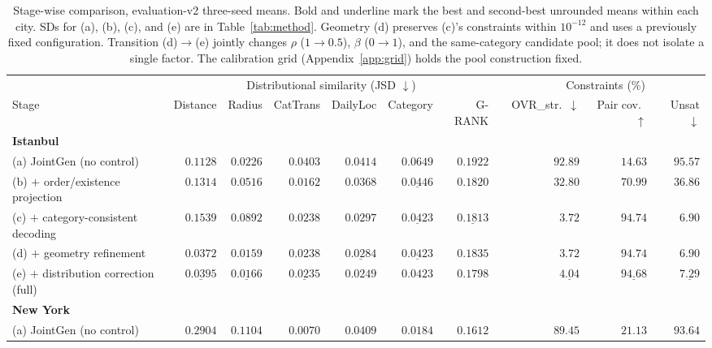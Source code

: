 \begin{table}[t]
\centering
\scriptsize
\setlength{\tabcolsep}{2pt}
\caption{Stage-wise comparison, evaluation-v2 three-seed means. Bold and underline mark the best and second-best unrounded means within each city. SDs for (a), (b), (c),
and (e) are in Table~\ref{tab:method}. Geometry (d) preserves (c)'s constraints within
$10^{-12}$ and uses a previously fixed configuration. Transition (d)$\to$(e) jointly
changes $\rho$ ($1\to0.5$), $\beta$ ($0\to1$), and the same-category candidate pool;
it does not isolate a single factor. The calibration grid (Appendix~\ref{app:grid})
holds the pool construction fixed.}
\label{tab:stagewise}
\begin{tabular}{lrrrrrrcrrr}
\toprule
& \multicolumn{6}{c}{Distributional similarity (JSD $\downarrow$)} & & \multicolumn{3}{c}{Constraints (\%)} \\
\cmidrule(lr){2-7}\cmidrule(lr){9-11}
Stage & Distance & Radius & CatTrans & DailyLoc & Category & G-RANK & & OVR\_str.\ $\downarrow$ & Pair cov.\ $\uparrow$ & Unsat $\downarrow$ \\
\midrule
\multicolumn{11}{l}{\textbf{Istanbul}} \\
(a) JointGen (no control) & $0.1128$ & $0.0226$ & $0.0403$ & $0.0414$ & $0.0649$ & $0.1922$ & & $92.89$ & $14.63$ & $95.57$ \\
(b) $+$ order/existence projection & $0.1314$ & $0.0516$ & $\mathbf{0.0162}$ & $0.0368$ & $\underline{0.0446}$ & $0.1820$ & & $32.80$ & $70.99$ & $36.86$ \\
(c) $+$ category-consistent decoding & $0.1539$ & $0.0892$ & $0.0238$ & $0.0297$ & $\underline{0.0423}$ & $\underline{0.1813}$ & & $\mathbf{3.72}$ & $\mathbf{94.74}$ & $\mathbf{6.90}$ \\
(d) $+$ geometry refinement & $\mathbf{0.0372}$ & $\mathbf{0.0159}$ & $0.0238$ & $\underline{0.0284}$ & $\underline{0.0423}$ & $0.1835$ & & $\mathbf{3.72}$ & $\mathbf{94.74}$ & $\mathbf{6.90}$ \\
(e) $+$ distribution correction (full) & $\underline{0.0395}$ & $\underline{0.0166}$ & $\underline{0.0235}$ & $\mathbf{0.0249}$ & $\mathbf{0.0423}$ & $\mathbf{0.1798}$ & & $\underline{4.04}$ & $\underline{94.68}$ & $\underline{7.29}$ \\
\midrule
\multicolumn{11}{l}{\textbf{New York}} \\
(a) JointGen (no control) & $0.2904$ & $0.1104$ & $\mathbf{0.0070}$ & $0.0409$ & $0.0184$ & $\mathbf{0.1612}$ & & $89.45$ & $21.13$ & $93.64$ \\

\end{tabular}
\end{table}
